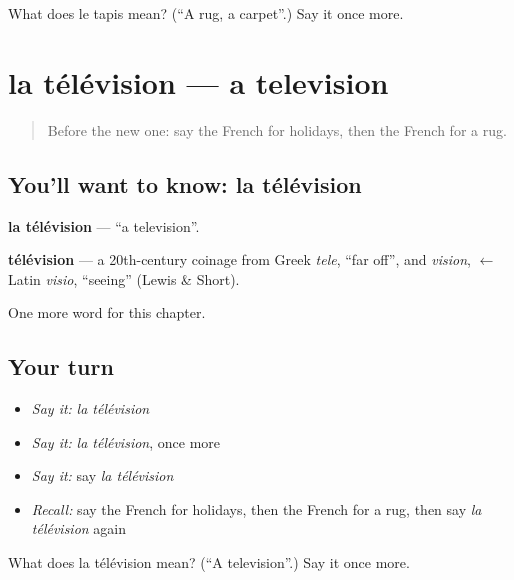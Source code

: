 \begin{tcolorbox}[breakable,colback=teal!4,colframe=teal!35!black,title={Before you move on}]
What does le tapis mean? (\textquotedblleft{}A rug, a carpet\textquotedblright{}.) Say it once more.
\end{tcolorbox}
\section[la télévision]{la télévision — a television}

\label{lesson:FR-C111-television}



\begin{quote}
Before the new one: say the French for holidays, then the French for a rug.
\end{quote}

\subsection*{You'll want to know: la télévision}
\textbf{la télévision} — \textquotedblleft{}a television\textquotedblright{}.

\begin{cousinweb}
\textbf{télévision} — a 20th-century coinage from Greek \emph{tele}, \textquotedblleft{}far off\textquotedblright{}, and \emph{vision}, $\leftarrow$ Latin \emph{visio}, \textquotedblleft{}seeing\textquotedblright{} (Lewis \& Short).
\end{cousinweb}

\begin{grammarlens}[title={What you've built}]
One more word for this chapter.
\end{grammarlens}

\subsection*{Your turn}
\begin{itemize}
\raggedright
  \item \emph{Say it:} \emph{la télévision}
  \item \emph{Say it:} \emph{la télévision}, once more
  \item \emph{Say it:} say \emph{la télévision}
  \item \emph{Recall:} say the French for holidays, then the French for a rug, then say \emph{la télévision} again
\end{itemize}

\begin{tcolorbox}[breakable,colback=teal!4,colframe=teal!35!black,title={Before you move on}]
What does la télévision mean? (\textquotedblleft{}A television\textquotedblright{}.) Say it once more.
\end{tcolorbox}
